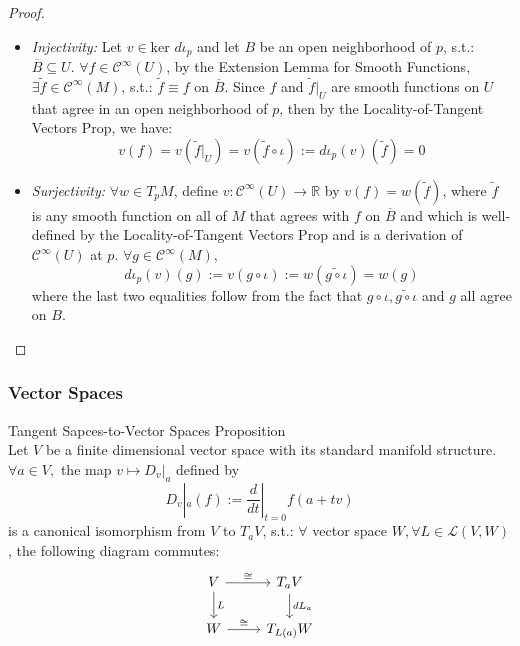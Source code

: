 \begin{proof}
    \begin{itemize}
        \item \textit{Injectivity:} Let $v\in \text{ker }d\iota_p$ and let $B$ be an open neighborhood of $p$, s.t.: $\overline{B} \subseteq U$. $\forall f\in \mathcal{C}^\infty (U)$, by the Extension Lemma for Smooth Functions, $\exists \widetilde{f} \in \mathcal{C}^\infty (M)$, s.t.: $\widetilde{f} \equiv f$ on $\overline{B}$. Since $f$ and $\widetilde{f}|_U$ are smooth functions on $U$ that agree in an open neighborhood of $p$, then by the Locality-of-Tangent Vectors Prop, we have:
        \[
        v(f)= v(\widetilde{f}|_U)= v(\widetilde{f} \circ \iota):= d\iota_p (v)(\widetilde{f}) =0
        \]

        \item \textit{Surjectivity:} $\forall w\in T_pM$, define $v:\mathcal{C}^\infty (U) \to \mathbb{R}$ by $v(f)= w(\widetilde{f})$, where $\widetilde{f}$ is any smooth function on all of $M$ that agrees with $f$ on $\overline{B}$ and which is well-defined by the Locality-of-Tangent Vectors Prop and is a derivation of $\mathcal{C}^\infty (U)$ at $p$. $\forall g\in \mathcal{C}^\infty (M)$,
        \[
        d\iota_p(v)(g) := v(g \circ \iota) := w(\widetilde{g \circ \iota})= w(g)
        \]
        where the last two equalities follow from the fact that $g\circ \iota, \widetilde{g \circ \iota}$ and $g$ all agree on $B$.
    \end{itemize}
\end{proof}

\subsubsection{Vector Spaces}

\begin{proposition}{Tangent Sapces-to-Vector Spaces Proposition}\\
Let $V$ be a finite dimensional vector space with its standard manifold structure. $\forall a\in V,$ the map $v\mapsto D_v|_a$ defined by
\[
D_v|_a(f):= \frac{d}{dt}|_{t=0} f(a+tv)
\]
is a canonical isomorphism from $V$ to $T_aV$, s.t.: $\forall$ vector space $W, \forall L\in \mathcal{L} (V,W)$, the following diagram commutes:
\[
\begin{tikzcd}
    V \arrow[r, "\cong"] \arrow[d, "L"] &T_aV \arrow[d, "dL_a"]\\
    W \arrow[r, "\cong"] &T_{L(a)}W
\end{tikzcd}
\]
\end{proposition}

